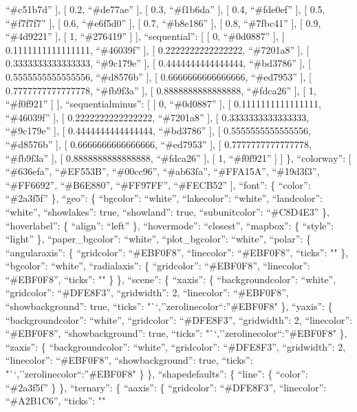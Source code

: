 \documentclass[
]{article}
\begin{document}
``\#c51b7d'' {]}, {[} 0.2, ``\#de77ae'' {]}, {[} 0.3, ``\#f1b6da'' {]},
{[} 0.4, ``\#fde0ef'' {]}, {[} 0.5, ``\#f7f7f7'' {]}, {[} 0.6,
``\#e6f5d0'' {]}, {[} 0.7, ``\#b8e186'' {]}, {[} 0.8, ``\#7fbc41'' {]},
{[} 0.9, ``\#4d9221'' {]}, {[} 1, ``\#276419'' {]} {]}, ``sequential'':
{[} {[} 0, ``\#0d0887'' {]}, {[} 0.1111111111111111, ``\#46039f'' {]},
{[} 0.2222222222222222, ``\#7201a8'' {]}, {[} 0.3333333333333333,
``\#9c179e'' {]}, {[} 0.4444444444444444, ``\#bd3786'' {]}, {[}
0.5555555555555556, ``\#d8576b'' {]}, {[} 0.6666666666666666,
``\#ed7953'' {]}, {[} 0.7777777777777778, ``\#fb9f3a'' {]}, {[}
0.8888888888888888, ``\#fdca26'' {]}, {[} 1, ``\#f0f921'' {]} {]},
``sequentialminus'': {[} {[} 0, ``\#0d0887'' {]}, {[}
0.1111111111111111, ``\#46039f'' {]}, {[} 0.2222222222222222,
``\#7201a8'' {]}, {[} 0.3333333333333333, ``\#9c179e'' {]}, {[}
0.4444444444444444, ``\#bd3786'' {]}, {[} 0.5555555555555556,
``\#d8576b'' {]}, {[} 0.6666666666666666, ``\#ed7953'' {]}, {[}
0.7777777777777778, ``\#fb9f3a'' {]}, {[} 0.8888888888888888,
``\#fdca26'' {]}, {[} 1, ``\#f0f921'' {]} {]} \}, ``colorway'': {[}
``\#636efa'', ``\#EF553B'', ``\#00cc96'', ``\#ab63fa'', ``\#FFA15A'',
``\#19d3f3'', ``\#FF6692'', ``\#B6E880'', ``\#FF97FF'', ``\#FECB52''
{]}, ``font'': \{ ``color'': ``\#2a3f5f'' \}, ``geo'': \{ ``bgcolor'':
``white'', ``lakecolor'': ``white'', ``landcolor'': ``white'',
``showlakes'': true, ``showland'': true, ``subunitcolor'': ``\#C8D4E3''
\}, ``hoverlabel'': \{ ``align'': ``left'' \}, ``hovermode'':
``closest'', ``mapbox'': \{ ``style'': ``light'' \}, ``paper\_bgcolor'':
``white'', ``plot\_bgcolor'': ``white'', ``polar'': \{ ``angularaxis'':
\{ ``gridcolor'': ``\#EBF0F8'', ``linecolor'': ``\#EBF0F8'', ``ticks'':
"" \}, ``bgcolor'': ``white'', ``radialaxis'': \{ ``gridcolor'':
``\#EBF0F8'', ``linecolor'': ``\#EBF0F8'', ``ticks'': "" \} \},
``scene'': \{ ``xaxis'': \{ ``backgroundcolor'': ``white'',
``gridcolor'': ``\#DFE8F3'', ``gridwidth'': 2, ``linecolor'':
``\#EBF0F8'', ``showbackground'': true, ``ticks'':
"``,''zerolinecolor``:''\#EBF0F8" \}, ``yaxis'': \{ ``backgroundcolor'':
``white'', ``gridcolor'': ``\#DFE8F3'', ``gridwidth'': 2, ``linecolor'':
``\#EBF0F8'', ``showbackground'': true, ``ticks'':
"``,''zerolinecolor``:''\#EBF0F8" \}, ``zaxis'': \{ ``backgroundcolor'':
``white'', ``gridcolor'': ``\#DFE8F3'', ``gridwidth'': 2, ``linecolor'':
``\#EBF0F8'', ``showbackground'': true, ``ticks'':
"``,''zerolinecolor``:''\#EBF0F8" \} \}, ``shapedefaults'': \{ ``line'':
\{ ``color'': ``\#2a3f5f'' \} \}, ``ternary'': \{ ``aaxis'': \{
``gridcolor'': ``\#DFE8F3'', ``linecolor'': ``\#A2B1C6'', ``ticks'': ""
\end{document}
